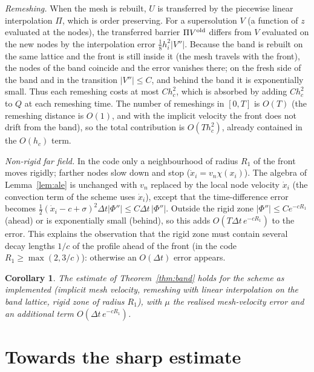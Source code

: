 \documentclass[11pt]{amsart}
\newtheorem{corollary}[theorem]{Corollary}
\theoremstyle{remark}
\begin{document}
\emph{Remeshing.} When the mesh is rebuilt, $U$ is transferred by the
piecewise linear interpolation $\Pi$, which is order preserving. For a
supersolution $V$ (a function of $z$ evaluated at the nodes), the transferred
barrier $\Pi V^{\rm old}$ differs from $V$ evaluated on the new nodes by the
interpolation error $\frac18h_i^2|V''|$. Because the band is rebuilt on the same
lattice and the front is still inside it (the mesh travels with the front),
the nodes of the band coincide and the error vanishes there; on the fresh
side of the band and in the transition $|V''|\le C$, and behind the band it
is exponentially small. Thus each remeshing costs at most $Ch_c^2$, which is
absorbed by adding $Ch_c^2$ to $Q$ at each remeshing time. The number of
remeshings in $[0,T]$ is $O(T)$ (the remeshing distance is $O(1)$, and with
the implicit velocity the front does not drift from the band), so the total
contribution is $O(Th_c^2)$, already contained in the $O(h_c)$ term.

\emph{Non-rigid far field.} In the code only a neighbourhood of radius
$R_1$ of the front moves rigidly; farther nodes slow down and stop
($\dot x_i=v_n\chi(x_i)$). The algebra of Lemma~\ref{lem:ale} is unchanged with
$v_n$ replaced by the local node velocity $\dot x_i$ (the convection term of the
scheme uses $\dot x_i$), except that the time-difference error becomes
$\frac12(\dot x_i-c+\sigma)^2\Delta t|\Phi''|\le C\Delta t\,|\Phi''|$. Outside the rigid
zone $|\Phi''|\le Ce^{-cR_1}$ (ahead) or is exponentially small (behind), so
this adds $O(T\Delta t\,e^{-cR_1})$ to the error. This explains the observation
that the rigid zone must contain several decay lengths $1/c$ of the profile
ahead of the front (in the code $R_1\ge\max(2,3/c)$): otherwise an
$O(\Delta t)$ error appears.

\begin{corollary}
The estimate of Theorem~\ref{thm:band} holds for the scheme as implemented
(implicit mesh velocity, remeshing with linear interpolation on the band
lattice, rigid zone of radius $R_1$), with $\mu$ the realised mesh-velocity
error and an additional term $O(\Delta t\,e^{-cR_1})$.
\end{corollary}

\section{Towards the sharp estimate}\label{sec:sharp}
\end{document}
